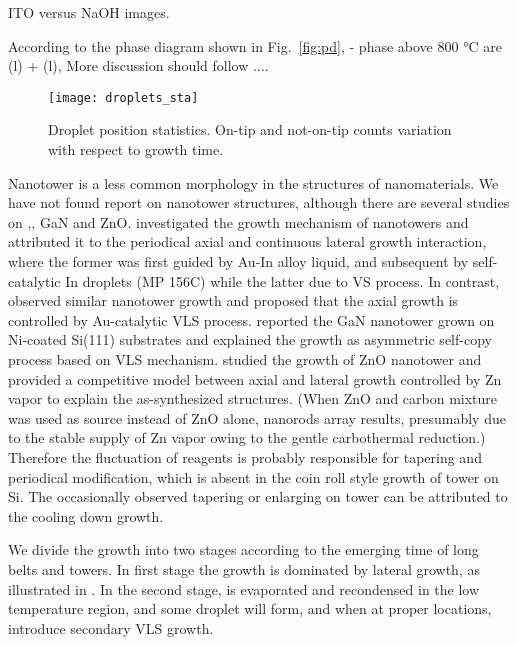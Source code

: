 ITO versus NaOH images.

According to the phase diagram shown in Fig.~\ref{fig:pd},  -  phase above 800 \si{\degreeCelsius} are (l) + (l), More discussion should follow $\ldots$.


\begin{figure}[htb]
\centering
\texttt{[image: droplets\_sta]}
\caption[Droplet position statistics]{Droplet position statistics. On-tip and not-on-tip counts variation with respect to growth time. }
\label{fig:mo3dropsta}
\end{figure}


Nanotower is a less common morphology in the structures of nanomaterials.\cite{Kharissova2010} We have not found report on   nanotower structures, although there are several studies on ,\cite{Jean2010,Yan2007}, GaN\cite{Xiao2012} and ZnO\cite{Zhang2013c}. \citeauthor{Jean2010} investigated the growth mechanism of  nanotowers and attributed it to the periodical axial and continuous lateral growth interaction, where the former was first guided by Au-In alloy liquid, and subsequent by self-catalytic In droplets (MP 156C) while the latter due to VS process. In contrast, \citeauthor{Yan2007} observed similar  nanotower growth and proposed that the axial growth is controlled by Au-catalytic VLS process. \citeauthor{Xiao2012} reported the GaN nanotower grown on Ni-coated Si(111) substrates and explained the growth as asymmetric self-copy process based on VLS mechanism. \citeauthor{Zhang2013c} studied the growth of ZnO nanotower and provided a competitive model between axial and lateral growth controlled by Zn vapor to explain the as-synthesized structures. (When ZnO and carbon mixture was used as source instead of ZnO alone, nanorods array results, presumably due to the stable supply of Zn vapor owing to the gentle carbothermal reduction.) Therefore the fluctuation of reagents is probably responsible for tapering and periodical modification, which is absent in the coin roll style growth of  tower on Si. The occasionally observed tapering or enlarging on  tower can be attributed to the cooling down growth.

We divide the growth into two stages according to the emerging time of long belts and towers. In first stage the growth is dominated by lateral growth, as illustrated in . In the second stage,  is evaporated and recondensed in the low temperature region, and some droplet will form, and when at proper locations, introduce secondary VLS growth.

